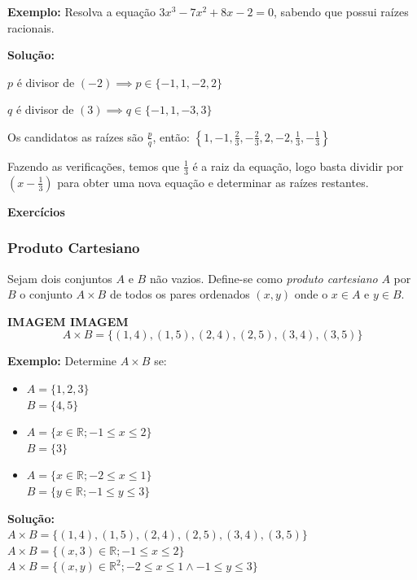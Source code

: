 \documentclass[oneside,a4paper,12pt]{article}
\begin{document}
\textbf{Exemplo:} Resolva a equação $3x^3-7x^2+8x-2=0$, sabendo que possui raízes racionais.

{\bf Solução:}

$p$ é divisor de $(-2) \implies p \in \{ -1,1,-2,2 \}$

$q$ é divisor de $(3) \implies q \in \{ -1,1,-3,3 \}$

Os candidatos as raízes são $\frac{p}{q}$, então: $\left\{1,-1, \displaystyle \frac{2}{3}, -\displaystyle \frac{2}{3},2,-2,\displaystyle \frac{1}{3}, -\displaystyle \frac{1}{3} \right\}$

Fazendo as verificações, temos que $\displaystyle \frac{1}{3}$ é a raiz da equação, logo basta dividir por $\left( x - \displaystyle \frac{1}{3} \right) $ para obter uma nova equação e determinar as raízes restantes.

\textbf{Exercícios}

\subsubsection{Produto Cartesiano}

Sejam dois conjuntos $A$ e $B$ não vazios. Define-se como {\it produto cartesiano} $A$ por $B$ o conjunto $A \times B$ de todos os pares ordenados $(x,y)$ onde o $x \in A$ e $y \in B$.

\vspace{130pt}
{\bf IMAGEM IMAGEM }
$$A \times B = \{ (1,4), (1,5), (2,4), (2,5), (3,4), (3,5)  \}$$

\textbf{Exemplo:} Determine $A \times B$ se:
\begin{itemize}
	\item $A = \{1,2,3\}$ \\ $B = \{4,5\}$
	\item $A = \{ x \in \mathbb{R} ; -1 \leq x \leq 2 \}$ \\ $B=\{3\}$
	\item $A = \{ x \in \mathbb{R} ; -2 \leq x \leq 1 \}$ \\ $B=\{y \in \mathbb{R}; -1 \leq y \leq 3\}$
\end{itemize}

{\bf Solução:}\\
$A \times B = \{ (1,4), (1,5), (2,4), (2,5), (3,4), (3,5)  \}$\\
$A \times B = \{ (x,3) \in \mathbb{R}; -1\leq x \leq 2  \}$\\
$A \times B = \{ (x,y) \in\mathbb{R}^2; -2 \leq x \leq 1 \land -1 \leq y \leq 3  \}$
\end{document}
